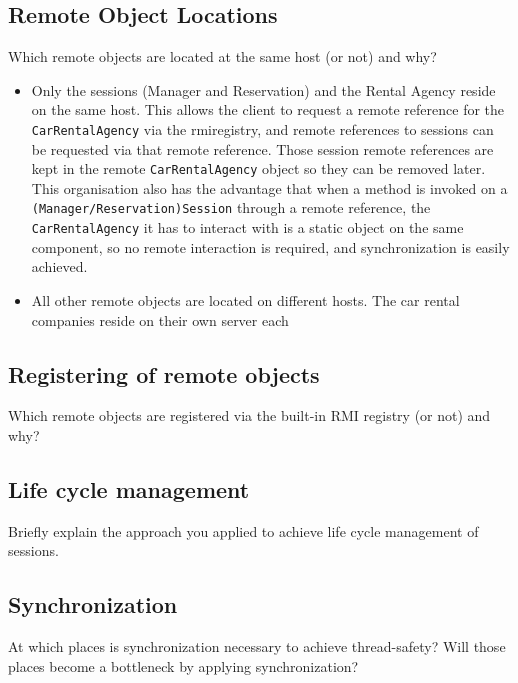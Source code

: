 \documentclass{scrartcl}
\begin{document}
	\subsection{Remote Object Locations}
    Which remote objects are located at the same host (or not) and why? \\
	\begin{itemize}
		\item Only the sessions (Manager and Reservation) and the Rental Agency
		reside on the same host. This allows the client to request a remote reference
		for the \texttt{CarRentalAgency} via the rmiregistry, and remote references to sessions can be requested via that remote reference. Those session remote references are kept in the remote \texttt{CarRentalAgency} object so they can be removed later. This organisation also has the advantage that when a method is invoked on a \texttt{(Manager/Reservation)Session} through a remote reference, the \texttt{CarRentalAgency} it has to interact with is a static object on the same component, so no remote interaction is required, and synchronization is easily achieved.
		\item All other remote objects are located on different hosts. The car rental companies reside on their own server each   
	\end{itemize}

	\subsection{Registering of remote objects}
    Which remote objects are registered via the built-in RMI registry (or not) and why? \\

    \subsection{Life cycle management}

    Briefly explain the approach you applied to achieve life cycle management of sessions. \\

    \subsection{Synchronization}

    At which places is synchronization necessary to achieve thread-safety?
    Will those places become a bottleneck by applying synchronization?
\end{document}
